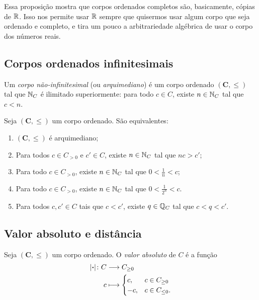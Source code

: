 Essa proposição mostra que corpos ordenados completos são, basicamente, cópias de $\mathbb{R}$. Isso nos permite usar $\mathbb{R}$ sempre que quisermos usar algum corpo que seja ordenado e completo, e tira um pouco a arbitrariedade algébrica de usar o corpo dos números reais.

\subsection{Corpos ordenados infinitesimais}

\begin{definition}
Um \emph{corpo não-infinitesimal} (ou \emph{arquimediano}) é um corpo ordenado $(\bm C,\leq)$ tal que $\mathbb{N}_C$ é ilimitado superiormente: para todo $c \in C$, existe $n \in \mathbb{N}_C$ tal que $c < n$.
\end{definition}

\begin{proposition}
Seja $(\bm C,\leq)$ um corpo ordenado. São equivalentes:
	\begin{enumerate}
	\item $(\bm C,\leq)$ é arquimediano;
	\item Para todos $c \in C_{>0}$ e $c' \in C$, existe $n \in \mathbb{N}_C$ tal que $nc>c'$;
	\item Para todo $c \in C_{>0}$, existe $n \in \mathbb{N}_C$ tal que $0<\frac{1}{n}<c$;
	\item Para todo $c \in C_{>0}$, existe $n \in \mathbb{N}_C$ tal que $0<\frac{1}{2^n}<c$.
	\item Para todos $c,c' \in C$ tais que $c<c'$, existe $q \in \mathbb{Q}_C$ tal que $c < q < c'$.
	\end{enumerate}
\end{proposition}



\subsection{Valor absoluto e distância}


\begin{definition}
Seja $(\bm C,\leq)$ um corpo ordenado. O \emph{valor absoluto} de $C$ é a função
	\begin{align*}
	\func{\abs{\var}}{C}{C_{\geq 0}}{c}{
		\begin{cases}
			c,& c \in C_{\geq 0} \\
			-c,& c \in C_{\leq 0}.
		\end{cases}
	}
	\end{align*}
\end{definition}

